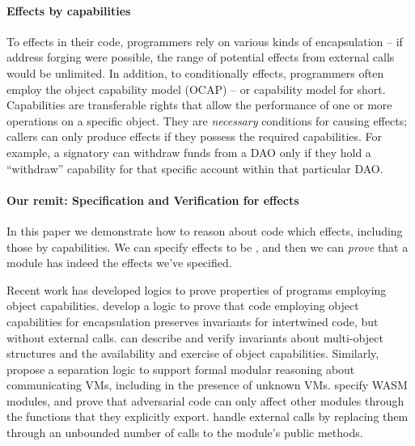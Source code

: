 \paragraph{Effects \tamed by capabilities} 
To \tame  effects  in their code, 
programmers rely on various kinds of  encapsulation -- \eg if address forging were possible, the range of potential effects from external calls would be unlimited.
In addition, to conditionally \tame effects, programmers often 
employ  the object capability model (OCAP)\cite{MillerPhD} --
 or capability model for short. 
Capabilities are transferable rights that allow the performance of one or more operations on a specific object. 
They are {\emph{necessary}} conditions for causing effects; callers can only produce effects if they possess the required capabilities. 
For example, a signatory can withdraw funds from a DAO only if they hold a ``withdraw'' capability for that specific account within that particular DAO.  



\paragraph{Our remit:  Specification and Verification for  \tamed effects}
In this paper we demonstrate how to reason about  code which \tames effects,
{including those \tamed by capabilities.}  
We can specify effects to be \tamed, 
and then we can \emph{prove} that a module has indeed \tamed the effects we've specified.

Recent work has developed logics to prove properties of programs employing object capabilities.
\citet{ddd} develop a logic to prove that code employing object
capabilities for encapsulation preserves invariants for
intertwined code, but without external calls. 
  \citet{dd}  can describe and verify invariants
about multi-object structures and the availability and exercise of object capabilities.  %
 Similarly,
{\citet{vmsl-pldi2023} propose a separation logic to support formal modular reasoning about communicating VMs, including in the presence of unknown VMs.
\citet{irisWasm23} specify WASM modules, %
and prove that adversarial code  can only affect other modules through the functions} that they explicitly export. 
\citet{CassezFQ24}  handle external calls by replacing them through an unbounded number of calls to the module's public methods.
 

